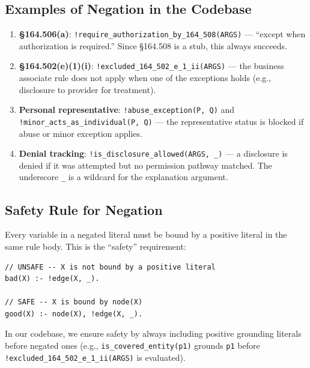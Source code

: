 \documentclass[11pt,letterpaper]{article}
\begin{document}
\subsection{Examples of Negation in the Codebase}

\begin{enumerate}
  \item \textbf{\S 164.506(a)}: \texttt{!require\_authorization\_by\_164\_508(ARGS)} --- ``except when authorization is required.'' Since \S 164.508 is a stub, this always succeeds.

  \item \textbf{\S 164.502(e)(1)(i)}: \texttt{!excluded\_164\_502\_e\_1\_ii(ARGS)} --- the business associate rule does not apply when one of the exceptions holds (e.g., disclosure to provider for treatment).

  \item \textbf{Personal representative}: \texttt{!abuse\_exception(P, Q)} and \texttt{!minor\_acts\_as\_individual(P, Q)} --- the representative status is blocked if abuse or minor exception applies.

  \item \textbf{Denial tracking}: \texttt{!is\_disclosure\_allowed(ARGS, \_)} --- a disclosure is denied if it was attempted but no permission pathway matched. The underscore \texttt{\_} is a wildcard for the explanation argument.
\end{enumerate}

\subsection{Safety Rule for Negation}

Every variable in a negated literal must be bound by a positive literal in the same rule body. This is the ``safety'' requirement:

\begin{lstlisting}[style=soufflestyle]
// UNSAFE -- X is not bound by a positive literal
bad(X) :- !edge(X, _).

// SAFE -- X is bound by node(X)
good(X) :- node(X), !edge(X, _).
\end{lstlisting}

In our codebase, we ensure safety by always including positive grounding literals before negated ones (e.g., \texttt{is\_covered\_entity(p1)} grounds \texttt{p1} before \texttt{!excluded\_164\_502\_e\_1\_ii(ARGS)} is evaluated).


\end{document}
